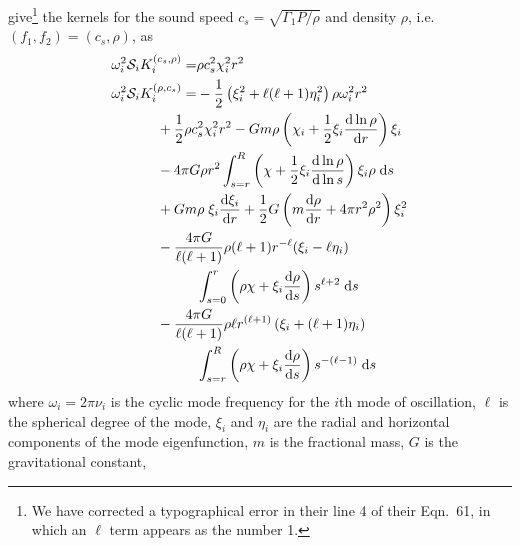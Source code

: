 \documentclass[twocolumn,twocolappendix]{aastex6}
\newcommand{\half}{\frac{1}{2}}
\newcommand{\Ltwo}{\ell(\ell+1)}
\newcommand{\ddra}[1]{\frac{\text{d} #1}{\text{d}r}}
\newcommand{\ddsa}[1]{\frac{\text{d} #1}{\text{d} s}}
\newcommand{\ddlsa}[1]{\frac{\text{d} #1}{\text{d}\ln s}}
\newcommand{\Kcr}{K_i^{(c_s, \rho)}}
\newcommand{\Krc}{K_i^{(\rho, c_s)}}
\begin{document}
\citet[][Eqns.\ 60-61]{GoughThompson1991} give\footnote{We have corrected a typographical error in their line 4 of their Eqn.~61, in which an $\ell$ term appears as the number 1.} the kernels for the sound speed $c_s = \sqrt{\Gamma_1 P/\rho}$ and density $\rho$, i.e.\ $(f_1, f_2) = (c_s, \rho)$, as
\begin{align}
    \omega_i^2 \mathcal{S}_i \Kcr =& \rho c_s^2 \chi_i^2 r^2
\\  \omega_i^2 \mathcal{S}_i \Krc =& -\half \left( \xi_i^2 + \Ltwo \eta_i^2 \right) \rho \omega_i^2 r^2
\notag\\&\hspace*{-1cm} + \frac{1}{2} \rho c_s^2 \chi_i^2 r^2 - G m \rho \left( \chi_i + \half \xi_i \ddra{\ln \rho} \right) \xi_i
\notag\\&\hspace*{-1cm} - 4\pi G \rho r^2 \int_{s=r}^R \left( \chi + \half \xi_i \ddlsa{\ln \rho} \right) \xi_i \rho \; \text{d}s
\notag\\&\hspace*{-1cm} + G m \rho \; \xi_i \ddra{\xi_i} + \half G \left(m \ddra{\rho} + 4\pi r^2 \rho^2 \right) \xi_i^2
\notag\\&\hspace*{-1cm} - \frac{4 \pi G}{\Ltwo} \rho (\ell+1) r^{-\ell} (\xi_i - \ell \eta_i)
\notag\\&\int_{s=0}^r \left(\rho \chi + \xi_i \ddsa{\rho} \right) s^{\ell+2} \; \text{d}s 
\notag\\&\hspace*{-1cm} - \frac{4 \pi G}{\Ltwo} \rho \ell r^{(\ell+1)} \left( \xi_i + (\ell+1) \eta_i \right)
\notag\\&\int_{s=r}^R \left( \rho \chi + \xi_i \ddsa{\rho} \right) s^{-(\ell-1)} \; \text{d}s
\end{align}
where $\omega_i=2\pi\nu_i$ is the cyclic mode frequency for the $i$th mode of oscillation, $\ell$ is the spherical degree of the mode, $\xi_i$ and $\eta_i$ are the radial and horizontal components of the mode eigenfunction, $m$ is the fractional mass, $G$ is the gravitational constant, 
\end{document}
